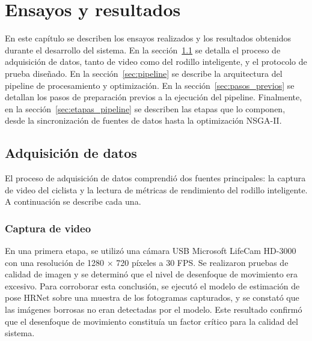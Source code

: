 
\chapter{Ensayos y resultados}
\label{Chapter4}

En este capítulo se describen los ensayos realizados y los resultados
obtenidos durante el desarrollo del sistema. En la
sección~\ref{sec:adquisicion_ensayo} se detalla el proceso de adquisición de datos,
tanto de video como del rodillo inteligente, y el protocolo de prueba
diseñado. En la sección~\ref{sec:pipeline} se describe la arquitectura del pipeline
de procesamiento y optimización. En la sección~\ref{sec:pasos_previos} se
detallan los pasos de preparación previos a la ejecución del pipeline.
Finalmente, en la sección~\ref{sec:etapas_pipeline} se describen las etapas
que lo componen, desde la sincronización de fuentes de datos hasta la
optimización NSGA-II.

\section{Adquisición de datos}
\label{sec:adquisicion_ensayo}

El proceso de adquisición de datos comprendió dos fuentes principales: la
captura de video del ciclista y la lectura de métricas de rendimiento del
rodillo inteligente. A continuación se describe cada una.

\subsection{Captura de video}
\label{ssec:captura_video}

En una primera etapa, se utilizó una cámara USB Microsoft LifeCam HD-3000
con una resolución de 1280 $\times$ 720 píxeles a 30 FPS. Se realizaron pruebas
de calidad de imagen y se determinó que el nivel de desenfoque de movimiento era
excesivo. Para corroborar esta conclusión, se ejecutó el modelo de estimación
de pose HRNet sobre una muestra de los fotogramas capturados, y se constató
que las imágenes borrosas no eran detectadas por el modelo. Este resultado
confirmó que el desenfoque de movimiento constituía un factor crítico para la
calidad del sistema.

